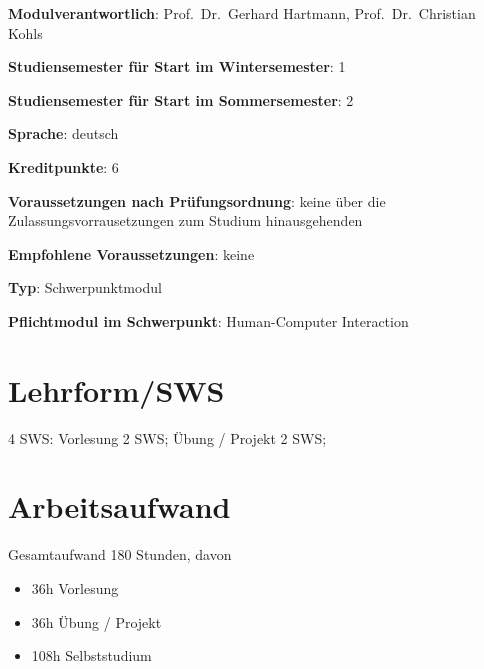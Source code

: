 \begin{modulHead}
\textbf{Modulverantwortlich}: Prof.~Dr.~Gerhard
Hartmann, Prof.~Dr.~Christian
Kohls
\end{modulHead}
\begin{modulHead}
\textbf{Studiensemester für
Start im Wintersemester}:
1
\end{modulHead}
\begin{modulHead}
\textbf{Studiensemester für Start
im Sommersemester}:
2
\end{modulHead}
\begin{modulHead}
\textbf{Sprache}:
deutsch
\end{modulHead}
\begin{modulHead}
\textbf{Kreditpunkte}:
6
\end{modulHead}
\begin{modulHead}
\textbf{Voraussetzungen nach
Prüfungsordnung}: keine über die Zulassungsvorrausetzungen zum Studium
hinausgehenden
\end{modulHead}
\begin{modulHead}
\textbf{Empfohlene
Voraussetzungen}: keine
\end{modulHead}
\begin{modulHead}
\textbf{Typ}:
Schwerpunktmodul
\end{modulHead}
\begin{modulHead}
\textbf{Pflichtmodul
im Schwerpunkt}: Human-Computer Interaction
\end{modulHead}


\section*{Lehrform/SWS\label{/mi-2017/modulbeschreibungen-master/MA_HCI_Design_Methodologies}}\label{lehrformswspathlabelmi-2017modulbeschreibungen-mastermaux5fhciux5fdesignux5fmethodologies}

4 SWS: Vorlesung 2 SWS; Übung / Projekt 2 SWS;

\section*{Arbeitsaufwand\label{/mi-2017/modulbeschreibungen-master/MA_HCI_Design_Methodologies}}\label{arbeitsaufwandpathlabelmi-2017modulbeschreibungen-mastermaux5fhciux5fdesignux5fmethodologies}

Gesamtaufwand 180 Stunden, davon

\begin{itemize}
\tightlist
\item
  36h Vorlesung
\item
  36h Übung / Projekt
\item
  108h Selbststudium
\end{itemize}

